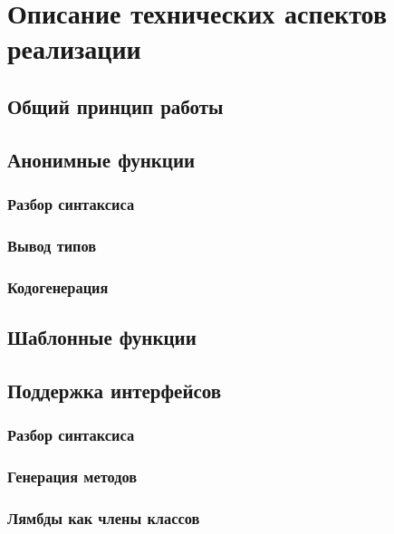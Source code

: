 
\chapter{Описание технических аспектов реализации}

\section{Общий принцип работы}

\section{Анонимные функции}
\subsection{Разбор синтаксиса}
\subsection{Вывод типов}
\subsection{Кодогенерация}

\section{Шаблонные функции}

\section{Поддержка интерфейсов}
\subsection{Разбор синтаксиса}
\subsection{Генерация методов}
\subsection{Лямбды как члены классов}

\chapterconclusion
